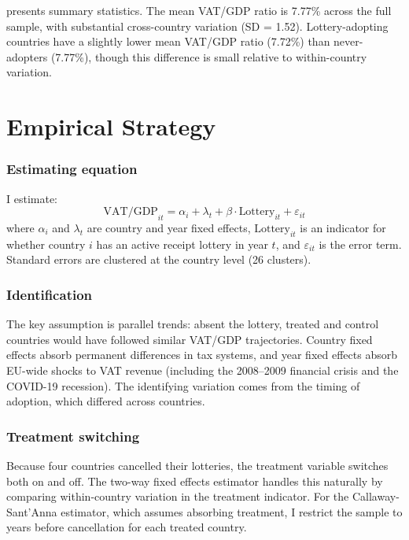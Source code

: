 \documentclass[12pt]{article}
\begin{document}


 presents summary statistics. The mean VAT/GDP ratio is 7.77\% across the full sample, with substantial cross-country variation (SD = 1.52). Lottery-adopting countries have a slightly lower mean VAT/GDP ratio (7.72\%) than never-adopters (7.77\%), though this difference is small relative to within-country variation.




\section{Empirical Strategy}

\subsubsection*{Estimating equation} I estimate:
\begin{equation}
\text{VAT/GDP}_{it} = \alpha_i + \lambda_t + \beta \cdot \text{Lottery}_{it} + \varepsilon_{it}
\end{equation}
where $\alpha_i$ and $\lambda_t$ are country and year fixed effects, $\text{Lottery}_{it}$ is an indicator for whether country $i$ has an active receipt lottery in year $t$, and $\varepsilon_{it}$ is the error term. Standard errors are clustered at the country level (26 clusters).

\subsubsection*{Identification} The key assumption is parallel trends: absent the lottery, treated and control countries would have followed similar VAT/GDP trajectories. Country fixed effects absorb permanent differences in tax systems, and year fixed effects absorb EU-wide shocks to VAT revenue (including the 2008--2009 financial crisis and the COVID-19 recession). The identifying variation comes from the timing of adoption, which differed across countries.

\subsubsection*{Treatment switching} Because four countries cancelled their lotteries, the treatment variable switches both on and off. The two-way fixed effects estimator handles this naturally by comparing within-country variation in the treatment indicator. For the Callaway-Sant'Anna estimator, which assumes absorbing treatment, I restrict the sample to years before cancellation for each treated country.
\end{document}
